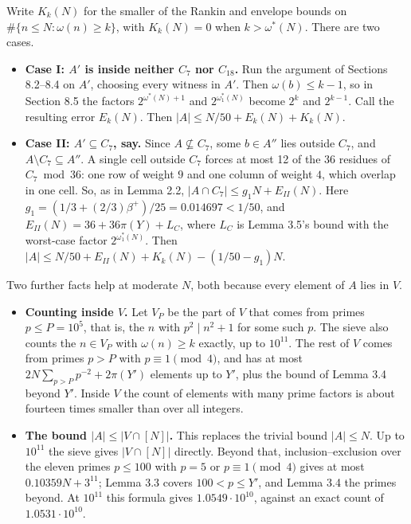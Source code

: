 \documentclass[
  11pt,
]{article}
\providecommand{\tightlist}{%
  \setlength{\itemsep}{0pt}\setlength{\parskip}{0pt}}
\begin{document}
Write \(K_k(N)\) for the smaller of the Rankin and envelope bounds on
\(\#\{n \le N : \omega(n) \ge k\}\), with \(K_k(N) = 0\) when
\(k > \omega^*(N)\). There are two cases.

\begin{itemize}
\tightlist
\item
  \textbf{Case I: \(A'\) is inside neither \(C_7\) nor \(C_{18}\).} Run
  the argument of Sections 8.2--8.4 on \(A'\), choosing every witness in
  \(A'\). Then \(\omega(b) \le k - 1\), so in Section 8.5 the factors
  \(2^{\omega^*(N)+1}\) and \(2^{\omega_1^*(N)}\) become \(2^{k}\) and
  \(2^{k-1}\). Call the resulting error \(E_k(N)\). Then
  \(|A| \le N/50 + E_k(N) + K_k(N)\).
\item
  \textbf{Case II: \(A' \subseteq C_7\), say.} Since
  \(A \not\subseteq C_7\), some \(b \in A''\) lies outside \(C_7\), and
  \(A \setminus C_7 \subseteq A''\). A single cell outside \(C_7\)
  forces at most 12 of the 36 residues of \(C_7 \bmod 36\): one row of
  weight \(9\) and one column of weight \(4\), which overlap in one
  cell. So, as in Lemma 2.2, \(|A \cap C_7| \le g_1N + E_{II}(N)\). Here
  \(g_1 = (1/3 + (2/3)\beta^{+})/25 = 0.014697 < 1/50\), and
  \(E_{II}(N) = 36 + 36\pi(Y) + L_C\), where \(L_C\) is Lemma 3.5's
  bound with the worst-case factor \(2^{\omega_1^*(N)}\). Then
  \(|A| \le N/50 + E_{II}(N) + K_k(N) - (1/50 - g_1)N\).
\end{itemize}

Two further facts help at moderate \(N\), both because every element of
\(A\) lies in \(V\).

\begin{itemize}
\tightlist
\item
  \textbf{Counting inside \(V\).} Let \(V_P\) be the part of \(V\) that
  comes from primes \(p \le P = 10^{5}\), that is, the \(n\) with
  \(p^2 \mid n^2 + 1\) for some such \(p\). The sieve also counts the
  \(n \in V_P\) with \(\omega(n) \ge k\) exactly, up to \(10^{11}\). The
  rest of \(V\) comes from primes \(p > P\) with
  \(p \equiv 1 \pmod{4}\), and has at most
  \(2N\sum_{p>P} p^{-2} + 2\pi(Y')\) elements up to \(Y'\), plus the
  bound of Lemma 3.4 beyond \(Y'\). Inside \(V\) the count of elements
  with many prime factors is about fourteen times smaller than over all
  integers.
\item
  \textbf{The bound \(|A| \le |V \cap [N]|\).} This replaces the trivial
  bound \(|A| \le N\). Up to \(10^{11}\) the sieve gives
  \(|V \cap [N]|\) directly. Beyond that, inclusion--exclusion over the
  eleven primes \(p \le 100\) with \(p = 5\) or \(p \equiv 1 \pmod{4}\)
  gives at most \(0.10359N + 3^{11}\); Lemma 3.3 covers
  \(100 < p \le Y'\), and Lemma 3.4 the primes beyond. At \(10^{11}\)
  this formula gives \(1.0549\cdot 10^{10}\), against an exact count of
  \(1.0531\cdot 10^{10}\).
\end{itemize}
\end{document}
